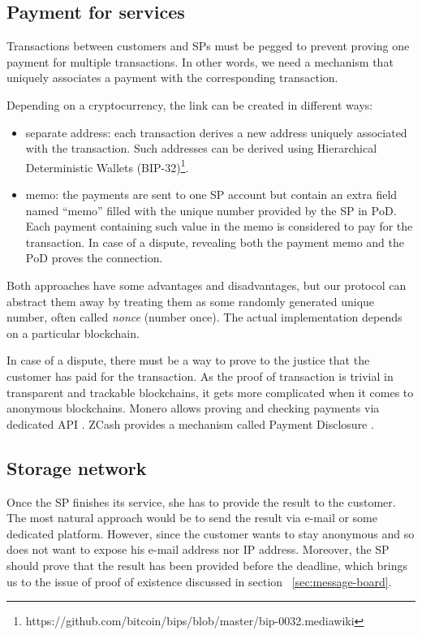 \documentclass{ieeeaccess}
\begin{document}
\subsection{Payment for services}\label{payment-for-services}
Transactions between customers and SPs must be pegged to prevent proving one payment for multiple transactions. In other
words, we need a mechanism that uniquely associates a payment with the corresponding transaction.

Depending on a cryptocurrency, the link can be created in different
ways:
\begin{itemize}

\item separate address: each transaction derives a new address uniquely associated with the transaction. Such addresses can be derived using Hierarchical Deterministic Wallets (BIP-32)\footnote{https://github.com/bitcoin/bips/blob/master/bip-0032.mediawiki}.
\item memo: the payments are sent to one SP account but contain an extra field named ``memo'' filled with the unique number provided by the SP in $\mathrm{PoD}$. Each payment containing such value in the memo is considered to pay for the transaction. In case of a dispute, revealing both the payment memo and the $\mathrm{PoD}$ proves the connection.
\end{itemize}

Both approaches have some advantages and disadvantages, but our protocol can abstract them away by treating them as some randomly generated unique number, often called \textit{nonce} (number once). The actual implementation depends on a particular blockchain.

In case of a dispute, there must be a way to prove to the justice that the customer has paid for the transaction. As the proof of transaction is trivial in transparent and trackable blockchains, it gets more complicated when it comes to anonymous blockchains. Monero allows proving and checking payments via dedicated API \cite{MoneroHowProve}. ZCash provides a mechanism called Payment Disclosure \cite{daviesIntroductionPaymentDisclosure2017}.

\subsection{Storage network}\label{storage-network}
Once the SP finishes its service, she has to provide the result to the customer. The most natural approach would be to send the result via e-mail or some dedicated platform. However, since the customer wants to stay anonymous and so does not want to expose his e-mail address nor IP address. Moreover, the SP should prove that the result has been provided before the deadline, which brings us to the issue of proof of existence discussed in section ~\ref{sec:message-board}.
\end{document}
